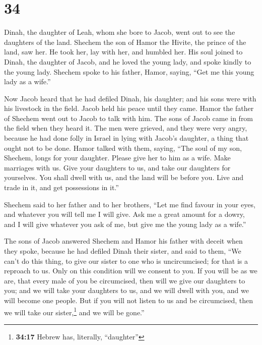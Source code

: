 \hypertarget{section-33}{%
\section{34}\label{section-33}}

 Dinah, the daughter of Leah, whom she bore to Jacob, went
out to see the daughters of the land.  Shechem the son of
Hamor the Hivite, the prince of the land, saw her. He took her, lay with
her, and humbled her.  His soul joined to Dinah, the
daughter of Jacob, and he loved the young lady, and spoke kindly to the
young lady.  Shechem spoke to his father, Hamor, saying,
``Get me this young lady as a wife.''

 Now Jacob heard that he had defiled Dinah, his daughter;
and his sons were with his livestock in the field. Jacob held his peace
until they came.  Hamor the father of Shechem went out to
Jacob to talk with him.  The sons of Jacob came in from
the field when they heard it. The men were grieved, and they were very
angry, because he had done folly in Israel in lying with Jacob's
daughter, a thing that ought not to be done.  Hamor talked
with them, saying, ``The soul of my son, Shechem, longs for your
daughter. Please give her to him as a wife.  Make
marriages with us. Give your daughters to us, and take our daughters for
yourselves.  You shall dwell with us, and the land will
be before you. Live and trade in it, and get possessions in it.''

 Shechem said to her father and to her brothers, ``Let me
find favour in your eyes, and whatever you will tell me I will give.
 Ask me a great amount for a dowry, and I will give
whatever you ask of me, but give me the young lady as a wife.''

 The sons of Jacob answered Shechem and Hamor his father
with deceit when they spoke, because he had defiled Dinah their sister,
 and said to them, ``We can't do this thing, to give our
sister to one who is uncircumcised; for that is a reproach to us.
 Only on this condition will we consent to you. If you
will be as we are, that every male of you be circumcised,
 then will we give our daughters to you; and we will take
your daughters to us, and we will dwell with you, and we will become one
people.  But if you will not listen to us and be
circumcised, then we will take our sister,\footnote{\textbf{34:17}
  Hebrew has, literally, ``daughter''} and we will be gone.''


